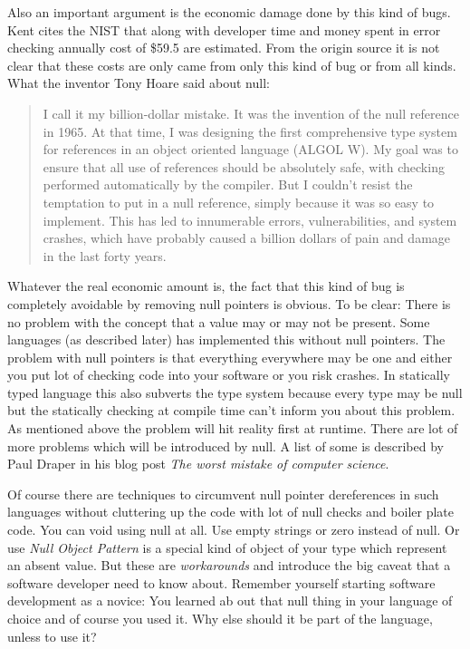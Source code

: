\documentclass[a4paper,12pt]{article}
\begin{document}
Also an important argument is the economic damage done by this kind of bugs. Kent\cite{kent-dyn-err-remediation} cites the NIST that along with developer time and money spent in error checking annually cost of \$59.5 are estimated. From the origin source it is not clear that these costs are only came from only this kind of bug or from all kinds. What the inventor Tony Hoare\cite{hoare-wiki} said about null\cite{hoeare-null}:

\begin{quotation}
I call it my billion-dollar mistake. It was the invention of the null reference in 1965. At that time, I was designing the first comprehensive type system for references in an object oriented language (ALGOL W). My goal was to ensure that all use of references should be absolutely safe, with checking performed automatically by the compiler. But I couldn't resist the temptation to put in a null reference, simply because it was so easy to implement. This has led to innumerable errors, vulnerabilities, and system crashes, which have probably caused a billion dollars of pain and damage in the last forty years.	
\end{quotation} 

Whatever the real economic amount is, the fact that this kind of bug is completely avoidable by removing null pointers is obvious. To be clear: There is no problem with the concept that a value may or may not be present. Some languages (as described later) has implemented this without null pointers. The problem with null pointers is that everything everywhere may be one and either you put lot of checking code into your software or you risk crashes. In statically typed language this also subverts the type system because every type may be null but the statically checking at compile time can't inform you about this problem. As mentioned above the problem will hit reality first at runtime. There are lot of more problems which will be introduced by null. A list of some is described by Paul Draper in his blog post \textit{The worst mistake of computer science}\cite{draper-worst-mistake-cs}.

Of course there are techniques to circumvent null pointer dereferences in such languages without cluttering up the code with lot of null checks and boiler plate code. You can void using null at all. Use empty strings or zero instead of null. Or use \textit{Null Object Pattern} is a special kind of object of your type which represent an absent value. But these are \textit{workarounds} and introduce the big caveat that a software developer need to know about. Remember yourself starting software development as a novice: You learned ab out that null thing in your language of choice and of course you used it. Why else should it be part of the language, unless to use it?
\end{document}
